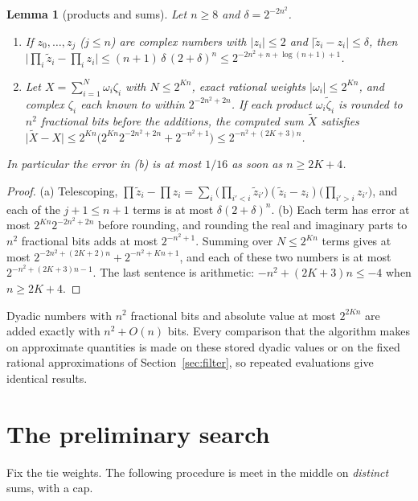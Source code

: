 \documentclass[11pt]{article}
\newtheorem{lemma}{Lemma}[section]
\theoremstyle{definition}
\newcommand{\abs}[1]{\lvert #1\rvert}
\begin{document}
\begin{lemma}[products and sums]\label{lem:sums}
Let $n\ge8$ and $\delta=2^{-2n^2}$.
\begin{enumerate}[label=\textup{(\alph*)}]
\item If $z_0,\dots,z_j$ ($j\le n$) are complex numbers with $\abs{z_i}\le2$ and $\abs{\tilde z_i-z_i}\le\delta$, then
$\bigl\lvert\prod_i\tilde z_i-\prod_iz_i\bigr\rvert\le(n+1)\,\delta\,(2+\delta)^{n}\le2^{-2n^2+n+\log(n+1)+1}$.
\item Let $X=\sum_{i=1}^{N}\omega_i\zeta_i$ with $N\le2^{Kn}$, exact rational weights $\abs{\omega_i}\le2^{Kn}$, and
complex $\zeta_i$ each known to within $2^{-2n^2+2n}$. If each product $\omega_i\tilde\zeta_i$ is rounded to $n^2$
fractional bits before the additions, the computed sum $\tilde X$ satisfies
$\abs{\tilde X-X}\le2^{Kn}\bigl(2^{Kn}2^{-2n^2+2n}+2^{-n^2+1}\bigr)\le2^{-n^2+(2K+3)n}$.
\end{enumerate}
In particular the error in \textup{(b)} is at most $1/16$ as soon as $n\ge2K+4$.
\end{lemma}
\begin{proof}
(a) Telescoping,
$\prod\tilde z_i-\prod z_i=\sum_{i}\bigl(\prod_{i'<i}\tilde z_{i'}\bigr)(\tilde z_i-z_i)\bigl(\prod_{i'>i}z_{i'}\bigr)$,
and each of the $j+1\le n+1$ terms is at most $\delta(2+\delta)^{n}$. (b) Each term has error at most
$2^{Kn}2^{-2n^2+2n}$ before rounding, and rounding the real and imaginary parts to $n^2$ fractional bits adds at
most $2^{-n^2+1}$. Summing over $N\le2^{Kn}$ terms gives at most $2^{-2n^2+(2K+2)n}+2^{-n^2+Kn+1}$, and each of
these two numbers is at most $2^{-n^2+(2K+3)n-1}$. The last sentence is
arithmetic: $-n^2+(2K+3)n\le-4$ when $n\ge2K+4$.
\end{proof}
Dyadic numbers with $n^2$ fractional bits and absolute value at most $2^{2Kn}$ are added exactly with $n^2+O(n)$
bits. Every comparison that the algorithm makes on approximate quantities is made on these stored dyadic values or
on the fixed rational approximations of Section~\ref{sec:filter}, so repeated evaluations give identical results.
\section{The preliminary search}\label{sec:prelim}
Fix the tie weights. The following procedure is meet in the middle on \emph{distinct} sums, with a cap.
\end{document}
